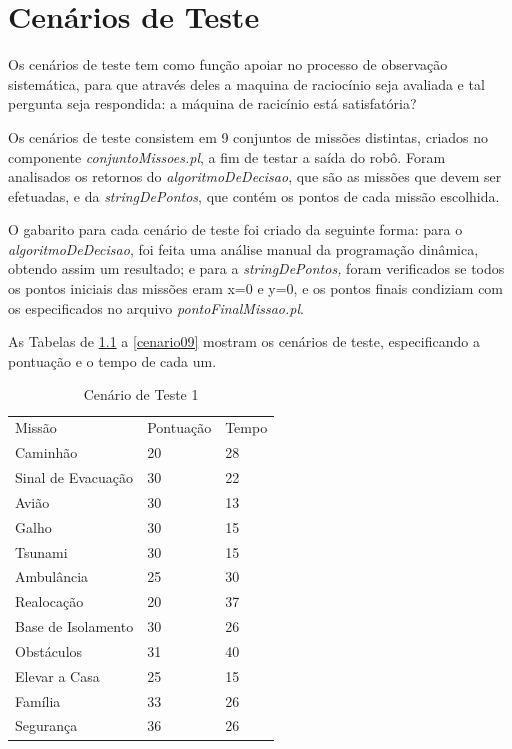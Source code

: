 \chapter{Cenários de Teste}\label{cenariosTeste}
	Os cenários de teste tem como função apoiar no processo de observação sistemática, para que através deles a maquina de raciocínio seja avaliada e tal pergunta seja respondida: a máquina de racicínio está satisfatória?
	
	Os cenários de teste consistem em 9 conjuntos de missões distintas, criados no componente \textit{conjuntoMissoes.pl}, a fim de testar a saída do robô. Foram analisados os retornos do \textit{algoritmoDeDecisao}, que são as missões que devem ser efetuadas, e da \textit{stringDePontos}, que contém os pontos de cada missão escolhida.

	O gabarito para cada cenário de teste foi criado da seguinte forma: para o \textit{algoritmoDeDecisao}, foi feita uma análise manual da programação dinâmica, obtendo assim um resultado; e para a \textit{stringDePontos,} foram verificados se todos os pontos iniciais das missões eram x=0 e y=0, e os pontos finais condiziam com os especificados no arquivo \textit{pontoFinalMissao.pl}.

	As Tabelas de \ref{cenario01} a \ref{cenario09} mostram os cenários de teste, especificando a pontuação e o  tempo de cada um.

\begin{table}[!h]
\centering
\caption{Cenário de Teste 1}
\label{cenario01}
\begin{tabular}{lll}
Missão             & Pontuação & Tempo \\
Caminhão           & 20        & 28    \\
Sinal de Evacuação & 30        & 22    \\
Avião              & 30        & 13    \\
Galho              & 30        & 15    \\
Tsunami            & 30        & 15    \\
Ambulância         & 25        & 30    \\
Realocação         & 20        & 37    \\
Base de Isolamento & 30        & 26    \\
Obstáculos         & 31        & 40    \\
Elevar a Casa      & 25        & 15    \\
Família            & 33        & 26    \\
Segurança          & 36        & 26   \\
\end{tabular}
\end{table}


